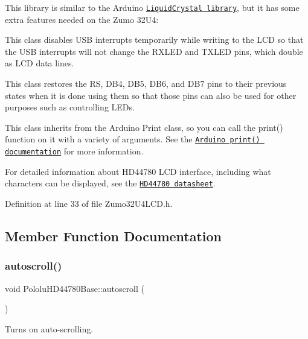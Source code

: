 This library is similar to the Arduino \href{http://arduino.cc/en/Reference/LiquidCrystal}{\tt Liquid\+Crystal library}, but it has some extra features needed on the Zumo 32\+U4\+:


\begin{DoxyItemize}
\item This class disables U\+SB interrupts temporarily while writing to the L\+CD so that the U\+SB interrupts will not change the R\+X\+L\+ED and T\+X\+L\+ED pins, which double as L\+CD data lines.
\item This class restores the RS, D\+B4, D\+B5, D\+B6, and D\+B7 pins to their previous states when it is done using them so that those pins can also be used for other purposes such as controlling L\+E\+Ds.
\end{DoxyItemize}

This class inherits from the Arduino Print class, so you can call the {\ttfamily print()} function on it with a variety of arguments. See the \href{http://arduino.cc/en/Serial/Print}{\tt Arduino print() documentation} for more information.

For detailed information about H\+D44780 L\+CD interface, including what characters can be displayed, see the \href{http://www.pololu.com/file/0J72/HD44780.pdf}{\tt H\+D44780 datasheet}. 

Definition at line 33 of file Zumo32\+U4\+L\+C\+D.\+h.



\subsection{Member Function Documentation}
\mbox{\label{class_pololu_h_d44780_base_ad5104d9651fd95704d1ae192073b0d61}} 
\subsubsection{\texorpdfstring{autoscroll()}{autoscroll()}}
{\footnotesize\ttfamily void Pololu\+H\+D44780\+Base\+::autoscroll (\begin{DoxyParamCaption}{ }\end{DoxyParamCaption})\hspace{0.3cm}{\ttfamily [inherited]}}

Turns on auto-\/scrolling.

